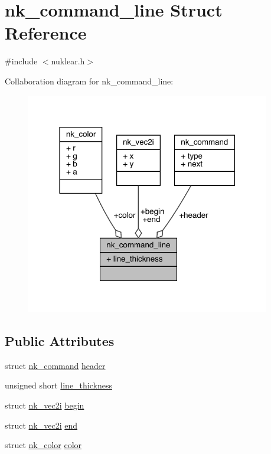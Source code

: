 \hypertarget{structnk__command__line}{}\section{nk\+\_\+command\+\_\+line Struct Reference}
\label{structnk__command__line}


{\ttfamily \#include $<$nuklear.\+h$>$}



Collaboration diagram for nk\+\_\+command\+\_\+line\+:
\nopagebreak
\begin{figure}[H]
\begin{center}
\leavevmode
\includegraphics[width=302pt]{structnk__command__line__coll__graph}
\end{center}
\end{figure}
\subsection*{Public Attributes}
\begin{DoxyCompactItemize}
\item 
struct \mbox{\hyperlink{structnk__command}{nk\+\_\+command}} \mbox{\hyperlink{structnk__command__line_a9ca513e60a7dabaaa4048ffecf0b86c9}{header}}
\item 
unsigned short \mbox{\hyperlink{structnk__command__line_a4cf2513ba2e852022553f1d7fff74d05}{line\+\_\+thickness}}
\item 
struct \mbox{\hyperlink{structnk__vec2i}{nk\+\_\+vec2i}} \mbox{\hyperlink{structnk__command__line_aaebd3121f997d61e5cd2afbd2a63258e}{begin}}
\item 
struct \mbox{\hyperlink{structnk__vec2i}{nk\+\_\+vec2i}} \mbox{\hyperlink{structnk__command__line_abae974f2c6c475c9cdd5d19e8c5a3ba1}{end}}
\item 
struct \mbox{\hyperlink{structnk__color}{nk\+\_\+color}} \mbox{\hyperlink{structnk__command__line_abc13f5b8ba019c8b0ef619ee8a3fc73d}{color}}
\end{DoxyCompactItemize}


